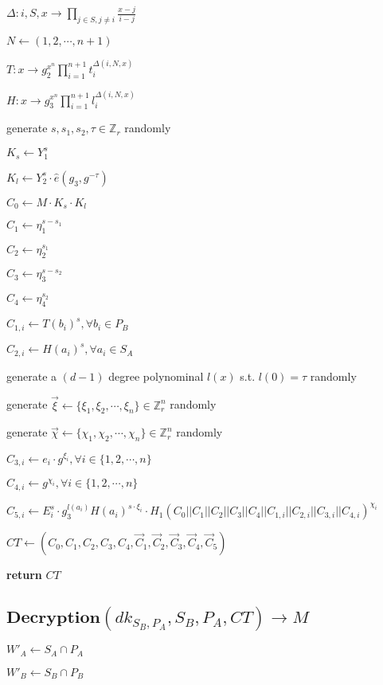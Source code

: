 \documentclass[a4paper]{article}
\begin{document}
$\Delta: i, S, x \rightarrow \prod\limits_{j \in S, j \neq i} \frac{x - j}{i - j}$

$N \gets (1, 2, \cdots, n + 1)$

$T: x \rightarrow g_2^{x^n} \prod\limits_{i = 1}^{n + 1} t_i^{\Delta(i, N, x)}$

$H: x \rightarrow g_3^{x^n} \prod\limits_{i = 1}^{n + 1} l_i^{\Delta(i, N, x)}$

generate $s, s_1, s_2, \tau \in \mathbb{Z}_r$ randomly

$K_s \gets Y_1^s$

$K_l \gets Y_2^s \cdot \hat{e}(g_3, g^{-\tau})$

$C_0 \gets M \cdot K_s \cdot K_l$

$C_1 \gets \eta_1^{s - s_1}$

$C_2 \gets \eta_2^{s_1}$

$C_3 \gets \eta_3^{s - s_2}$

$C_4 \gets \eta_4^{s_2}$

$C_{1, i} \gets T(b_i)^s, \forall b_i \in P_B$

$C_{2, i} \gets H(a_i)^s, \forall a_i \in S_A$

generate a $(d - 1)$ degree polynominal $l(x)$ s.t. $l(0) = \tau$ randomly

generate $\vec{\xi} \gets \{\xi_1, \xi_2, \cdots, \xi_n\} \in \mathbb{Z}_r^n$ randomly

generate $\vec{\chi} \gets \{\chi_1, \chi_2, \cdots, \chi_n\} \in \mathbb{Z}_r^n$ randomly

$C_{3, i} \gets e_i \cdot g^{\xi_i}, \forall i \in \{1, 2, \cdots, n\}$

$C_{4, i} \gets g^{\chi_i}, \forall i \in \{1, 2, \cdots, n\}$

$C_{5, i} \gets E_i^s \cdot g_3^{l(a_i)} H(a_i)^{s \cdot \xi_i} \cdot H_1(C_0 || C_1 || C_2 || C_3 || C_4 || C_{1, i} || C_{2, i} || C_{3, i} || C_{4, i})^{\chi_i}$

$\textit{CT} \gets (C_0, C_1, C_2, C_3, C_4, \vec{C}_1, \vec{C}_2, \vec{C}_3, \vec{C}_4, \vec{C}_5)$

\textbf{return} $\textit{CT}$

\subsection{$\textbf{Decryption}(\textit{dk}_{S_B, P_A}, S_B, P_A, \textit{CT}) \rightarrow M$}

$W'_A \gets S_A \cap P_A$

$W'_B \gets S_B \cap P_B$
\end{document}
